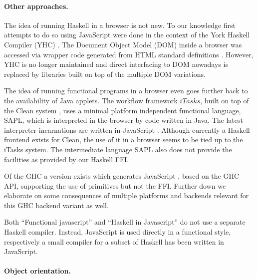 \documentclass{llncs}
\newcommand{\Varid}[1]{\mathit{#1}}
\begin{document}

\label{related}

\paragraph{Other approaches.}
The idea of running Haskell in a browser is not new.
To our knowledge
first attempts to do so using JavaScript were done in the context of
the York Haskell Compiler (YHC) \cite{www07yhc-javascript}.
The Document Object Model (DOM) inside a browser was accessed via wrapper code generated
from HTML standard definitions \cite{www07haskell-in-browser}.
However, YHC is no longer maintained and direct interfacing to DOM
nowadays is replaced by libraries built on top of the multiple DOM variations.

The idea of running functional programs in a browser even goes further back
to the availability of Java applets.
The workflow framework \ensuremath{\Varid{iTasks}}, built on top of the Clean system \cite{www11clean-system},
uses a minimal platform independent functional language, SAPL,
which is interpreted in the browser by code written in Java.
The latest interpreter incarnations are written in JavaScript
\cite{jansen10phd-itasks-sapl-funcweb,bruel10sapl-javascript,plasmeijer08clientside-itasks-ajax}.
Although currently a Haskell frontend exists for Clean, the use of it in a browser seems to be tied up to the iTasks system.
The intermediate language SAPL also does not provide the facilities as provided by our Haskell FFI.

Of the GHC a version exists which generates JavaScript \cite{www11ghcjs-git},
based on the GHC API, supporting the use of primitives but not the FFI.
Further down we elaborate on some consequences of multiple platforms and backends
relevant for this GHC backend variant as well.

Both ``Functional javascript'' \cite{www07functional-javascript} and
``Haskell in Javascript'' \cite{www10haskellinjavascript} do not use a separate Haskell compiler.
Instead, JavaScript is used directly in a functional style,
respectively a small compiler for a subset of Haskell has been written in JavaScript.

\paragraph{Object orientation.}
\end{document}
